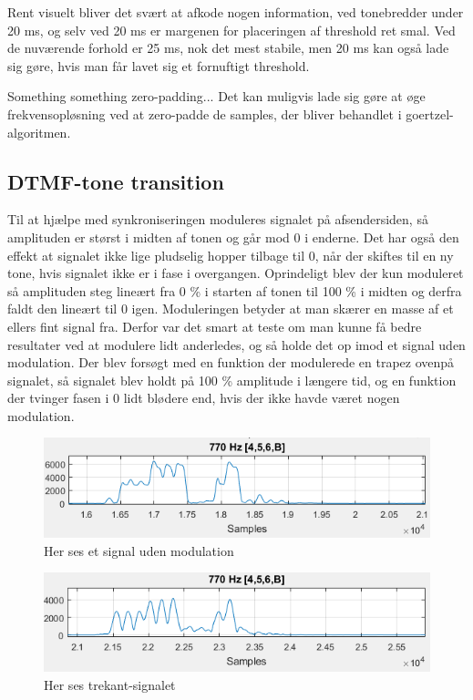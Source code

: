 Rent visuelt bliver det svært at afkode nogen information, ved tonebredder under 20 ms, og selv ved 20 ms er margenen for placeringen af threshold ret smal. Ved de nuværende forhold er 25 ms, nok det mest stabile, men 20 ms kan også lade sig gøre, hvis man får lavet sig et fornuftigt threshold.

Something something zero-padding... Det kan muligvis lade sig gøre at øge frekvensopløsning ved at zero-padde de samples, der bliver behandlet i goertzel-algoritmen.

\pagebreak

\subsection{DTMF-tone transition}

Til at hjælpe med synkroniseringen moduleres signalet på afsendersiden, så amplituden er størst i midten af tonen og går mod 0 i enderne. Det har også den effekt at signalet ikke lige pludselig hopper tilbage til 0, når der skiftes til en ny tone, hvis signalet ikke er i fase i overgangen. Oprindeligt blev der kun moduleret så amplituden steg lineært fra 0 \% i starten af tonen til 100 \% i midten og derfra faldt den lineært til 0 igen. Moduleringen betyder at man skærer en masse af et ellers fint signal fra. Derfor var det smart at teste om man kunne få bedre resultater ved at modulere lidt anderledes, og så holde det op imod et signal uden modulation. Der blev forsøgt med en funktion der modulerede en trapez ovenpå signalet, så signalet blev holdt på 100 \% amplitude i længere tid, og en funktion der tvinger fasen i 0 lidt blødere end, hvis der ikke havde været nogen modulation. 

\begin{figure}[hp]
\centering
\includegraphics[scale=0.8]{Billeder/Snap.PNG}
\caption{Her ses et signal uden modulation}
\label{fig:snap}
\end{figure} 

\begin{figure}[h]
\centering
\includegraphics[scale=0.8]{Billeder/Triangle.PNG}
\caption{Her ses trekant-signalet}
\label{fig:triangle}
\end{figure} 

